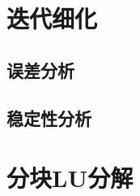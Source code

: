 \documentclass[a4paper,10pt]{ctexart}
\begin{document}
\section{迭代细化}

\subsection{误差分析}

\subsection{稳定性分析}

\section{分块LU分解}

\fi


\end{document}
